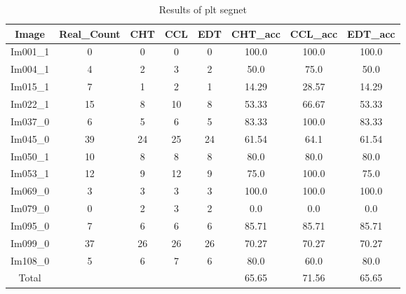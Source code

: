 \begin{table}[H]
\centering
\begin{tabular}{|c|c|c|c|c|c|c|c|}
\hline
 \textbf{Image} & \textbf{Real\_Count} & \textbf{CHT} & \textbf{CCL} & \textbf{EDT} & \textbf{CHT\_acc} & \textbf{CCL\_acc} & \textbf{EDT\_acc} \\ \hline
 Im001\_1 & 0 & 0 & 0 & 0 & 100.0 & 100.0 & 100.0 \\ 
 Im004\_1 & 4 & 2 & 3 & 2 & 50.0 & 75.0 & 50.0 \\ 
 Im015\_1 & 7 & 1 & 2 & 1 & 14.29 & 28.57 & 14.29 \\ 
 Im022\_1 & 15 & 8 & 10 & 8 & 53.33 & 66.67 & 53.33 \\ 
 Im037\_0 & 6 & 5 & 6 & 5 & 83.33 & 100.0 & 83.33 \\ 
 Im045\_0 & 39 & 24 & 25 & 24 & 61.54 & 64.1 & 61.54 \\ 
 Im050\_1 & 10 & 8 & 8 & 8 & 80.0 & 80.0 & 80.0 \\ 
 Im053\_1 & 12 & 9 & 12 & 9 & 75.0 & 100.0 & 75.0 \\ 
 Im069\_0 & 3 & 3 & 3 & 3 & 100.0 & 100.0 & 100.0 \\ 
 Im079\_0 & 0 & 2 & 3 & 2 & 0.0 & 0.0 & 0.0 \\ 
 Im095\_0 & 7 & 6 & 6 & 6 & 85.71 & 85.71 & 85.71 \\ 
 Im099\_0 & 37 & 26 & 26 & 26 & 70.27 & 70.27 & 70.27 \\ 
 Im108\_0 & 5 & 6 & 7 & 6 & 80.0 & 60.0 & 80.0 \\ \hline
 Total &   &   &   &   & 65.65 & 71.56 & 65.65 \\ 

\hline
\end{tabular}
\caption{Results of plt segnet}
\label{Results of plt segnet}
\end{table}
